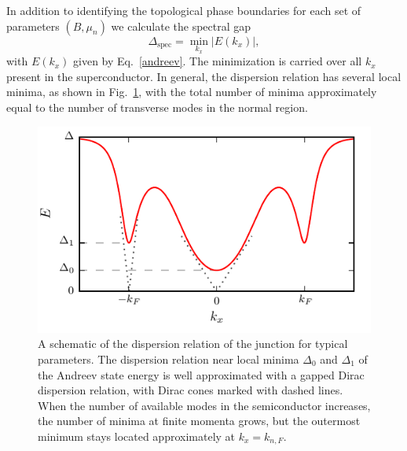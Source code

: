 In addition to identifying the topological phase boundaries for each set of parameters $(B, \mu_n)$ we calculate the spectral gap
\begin{equation}\label{specgap}
\Delta_\mathrm{spec}=\min_{k_x}|E(k_x)|,
\end{equation}
with $E(k_x)$ given by Eq.~\eqref{andreev}.
The minimization is carried over all $k_x$ present in the superconductor.
In general, the dispersion relation has several local minima, as shown in Fig.~\ref{fig:dispersion}, with the total number of minima approximately equal to the number of transverse modes in the normal region.

\begin{figure}
\begin{center}
\centering
\includegraphics[width=0.7\linewidth]{chapter_shortjunction/figures/dispersion}
\caption{A schematic of the dispersion relation of the junction for typical parameters.
The dispersion relation near local minima $\Delta_0$ and $\Delta_1$ of the Andreev state energy is well approximated with a gapped Dirac dispersion relation, with Dirac cones marked with dashed lines.
When the number of available modes in the semiconductor increases, the number of minima at finite momenta grows, but the outermost minimum stays located approximately at $k_x = k_{n,F}$.}
\label{fig:dispersion}
\end{center}
\end{figure}

